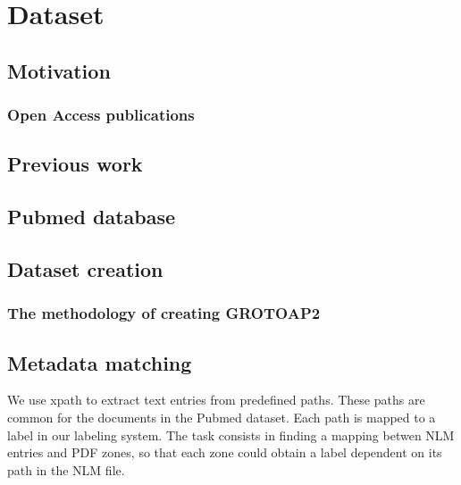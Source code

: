 \chapter{Dataset}
\section{Motivation}
\subsection{Open Access publications}
\section{Previous work}
\section{Pubmed database}
\section{Dataset creation}
\subsection{The methodology of creating GROTOAP2}
\section{Metadata matching}

We use xpath to extract text entries from predefined paths. These
paths are common for the documents in the Pubmed dataset. Each path is
mapped to a label in our labeling system. The task consists in finding
a mapping betwen NLM entries and PDF zones, so that each zone could
obtain a label dependent on its path in the NLM file.

